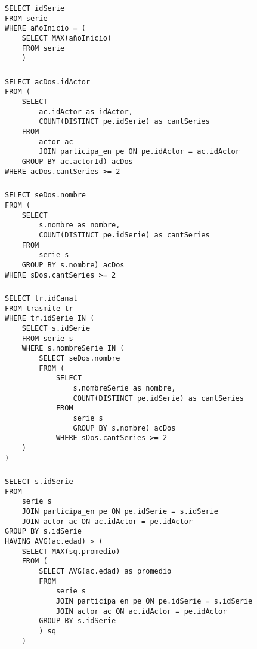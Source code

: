 \subsubsection{}
\begin{verbatim}
SELECT idSerie
FROM serie
WHERE añoInicio = (
	SELECT MAX(añoInicio)	
	FROM serie
	)
\end{verbatim}

\subsubsection{}
\begin{verbatim}
SELECT acDos.idActor
FROM (
	SELECT
		ac.idActor as idActor,
		COUNT(DISTINCT pe.idSerie) as cantSeries
	FROM
		actor ac
		JOIN participa_en pe ON pe.idActor = ac.idActor
	GROUP BY ac.actorId) acDos
WHERE acDos.cantSeries >= 2
\end{verbatim}

\subsubsection{}
\begin{verbatim}
SELECT seDos.nombre
FROM (
	SELECT
		s.nombre as nombre,
		COUNT(DISTINCT pe.idSerie) as cantSeries
	FROM
		serie s
	GROUP BY s.nombre) acDos
WHERE sDos.cantSeries >= 2
\end{verbatim}
\subsubsection{}
\begin{verbatim}
SELECT tr.idCanal
FROM trasmite tr
WHERE tr.idSerie IN (
	SELECT s.idSerie 
	FROM serie s
	WHERE s.nombreSerie IN (
		SELECT seDos.nombre
		FROM (
			SELECT
				s.nombreSerie as nombre,
				COUNT(DISTINCT pe.idSerie) as cantSeries
			FROM
				serie s
				GROUP BY s.nombre) acDos
			WHERE sDos.cantSeries >= 2
	)
)
\end{verbatim}

\subsubsection{}
\begin{verbatim}
SELECT s.idSerie
FROM
	serie s
	JOIN participa_en pe ON pe.idSerie = s.idSerie
	JOIN actor ac ON ac.idActor = pe.idActor
GROUP BY s.idSerie
HAVING AVG(ac.edad) > (
	SELECT MAX(sq.promedio)
	FROM (
		SELECT AVG(ac.edad) as promedio
		FROM
			serie s
			JOIN participa_en pe ON pe.idSerie = s.idSerie
			JOIN actor ac ON ac.idActor = pe.idActor
		GROUP BY s.idSerie
		) sq
	)
\end{verbatim}

